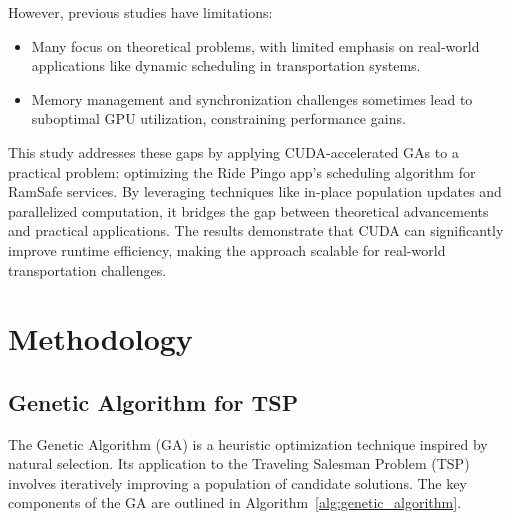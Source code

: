 \documentclass[conference]{IEEEtran}
\begin{document}
However, previous studies have limitations:
\begin{itemize}
    \item Many focus on theoretical problems, with limited emphasis on real-world applications like dynamic scheduling in transportation systems.
    \item Memory management and synchronization challenges sometimes lead to suboptimal GPU utilization, constraining performance gains.
\end{itemize}


This study addresses these gaps by applying CUDA-accelerated GAs to a practical problem: optimizing the Ride Pingo app’s scheduling algorithm for RamSafe services. By leveraging techniques like in-place population updates and parallelized computation, it bridges the gap between theoretical advancements and practical applications. The results demonstrate that CUDA can significantly improve runtime efficiency, making the approach scalable for real-world transportation challenges.


\section{Methodology}
\subsection{Genetic Algorithm for TSP}

The Genetic Algorithm (GA) is a heuristic optimization technique inspired by natural selection. Its application to the Traveling Salesman Problem (TSP) involves iteratively improving a population of candidate solutions. The key components of the GA are outlined in Algorithm~\ref{alg:genetic_algorithm}.\\
\end{document}
